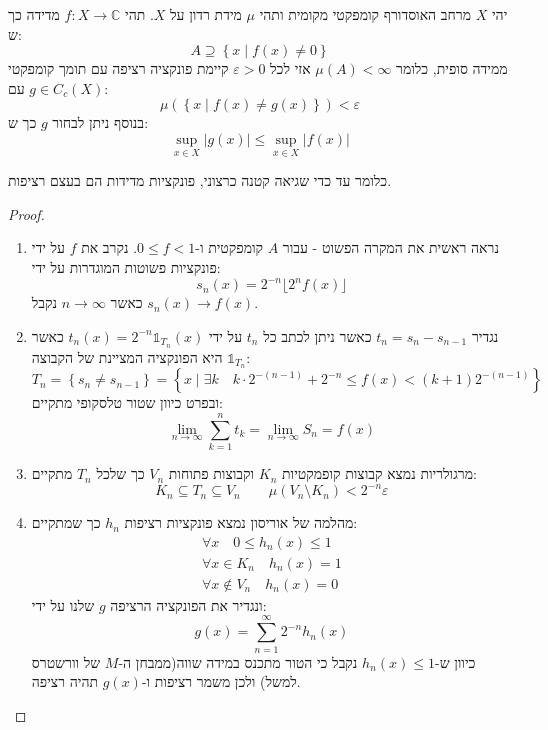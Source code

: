 \documentclass{tstextbook}
\begin{document}
\begin{theorem}
יהי \(X\) מרחב האוסדורף קומפקטי מקומית ותהי \(\mu\) מידת רדון על \(X\). תהי \(f:X\to \mathbb{C}\) מדידה כך ש:
$$A\supseteq\left\{  x\mid f(x)\neq 0  \right\}$$
ממידה סופית, כלומר \(\mu(A)<\infty\) אזי לכל \(\varepsilon> 0\) קיימת פונקציה רציפה עם תומך קומפקטי \(g \in C_{c}(X)\) עם:
$$\mu\left( \left\{  x\mid f(x)\neq g(x)  \right\} \right)< \varepsilon$$
בנוסף ניתן לבחור \(g\) כך ש:
$$\sup _{x \in X}\lvert g(x) \rvert \leq \sup _{x \in X} \lvert f(x) \rvert $$

\end{theorem}
כלומר עד כדי שגיאה קטנה כרצוני, פונקציות מדידות הם בעצם רציפות.

\begin{proof}
  \begin{enumerate}
    \item נראה ראשית את המקרה הפשוט - עבור \(A\) קומפקטית ו-\(0\leq f< 1\). נקרב את \(f\) על ידי פונקציות פשוטות המוגדרות על ידי: 
$$s_{n}(x)=2^{-n}\lfloor2^{n}f(x)\rfloor$$
כאשר \(n\to \infty\) נקבל \(s_{n}(x)\to f(x)\).


    \item נגדיר \(t_{n}=s_{n}-s_{n-1}\) כאשר ניתן לכתב כל \(t_{n}\) על ידי \(t_{n}(x)=2^{-n}\mathbb{1}_{T_{n}}(x)\) כאשר \(\mathbb{1}_{T_{n}}\) היא הפונקציה המציינת של הקבוצה: 
$$T_{n}=\left\{  s_{n}\neq s_{n-1}  \right\}=\left\{ x\mid\exists k\quad k\cdot2^{-(n-1)}+2^{-n}\leq f(x)<(k+1)2^{-(n-1)} \right\}$$
ובפרט כיוון שטור טלסקופי מתקיים:
$$\lim_{ n \to \infty } \sum _{k=1}^{n}t_{k}=\lim_{ n \to \infty } S_{n}=f(x)$$


    \item מרגולריות נמצא קבוצות קופמקטיות \(K_{n}\) וקבוצות פתוחות \(V_{n}\) כך שלכל \(T_{n}\) מתקיים: 
$$K_{n}\subseteq T_{n}\subseteq V_{n}\qquad \mu\left( V_{n}\setminus  K_{n} \right)< 2^{-n}\varepsilon$$


    \item מהלמה של אוריסון נמצא פונקציות רציפות \(h_{n}\) כך שמתקיים: 
$$\begin{gather}\forall x \quad 0\leq h_{n}(x)\leq 1  \\\forall x \in K_{n}\quad h_{n}(x)=1 \\\forall x \not  \in V_{n} \quad h_{n}(x)=0
\end{gather}$$
ונגדיר את הפונקציה הרציפה \(g\) שלנו על ידי:
$$g(x)=\sum_{n=1}^{\infty}2^{-n}h_{n}(x)$$
כיוון ש-\(h_{n}(x)\leq 1\) נקבל כי הטור מתכנס במידה שווה(ממבחן ה-\(M\) של וורשטרס למשל) ולכן משמר רציפות ו-\(g(x)\) תהיה רציפה.



\end{enumerate}
\end{proof}
\end{document}

